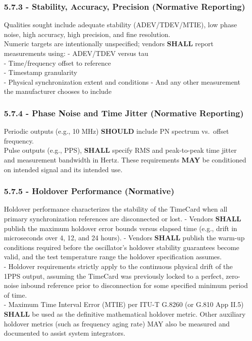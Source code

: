 \documentclass[
]{article}
\begin{document}
\subsubsection{5.7.3 - Stability, Accuracy, Precision (Normative
Reporting)}\label{stability-accuracy-precision-normative-reporting}

Qualities sought include adequate stability (ADEV/TDEV/MTIE), low phase
noise, high accuracy, high precision, and fine resolution.\\
Numeric targets are intentionally unspecified; vendors \textbf{SHALL}
report measurements using: - ADEV/TDEV versus tau\\
- Time/frequency offset to reference\\
- Timestamp granularity\\
- Physical synchronization extent and conditions - And any other
measurement the manufacturer chooses to include

\subsubsection{5.7.4 - Phase Noise and Time Jitter (Normative
Reporting)}\label{phase-noise-and-time-jitter-normative-reporting}

Periodic outputs (e.g., 10 MHz) \textbf{SHOULD} include PN spectrum
vs.~offset frequency.\\
Pulse outputs (e.g., PPS), \textbf{SHALL} specify RMS and peak-to-peak
time jitter and measurement bandwidth in Hertz. These requirements
\textbf{MAY} be conditioned on intended signal and its intended use.

\subsubsection{5.7.5 - Holdover Performance
(Normative)}\label{holdover-performance-normative}

Holdover performance characterizes the stability of the TimeCard when
all primary synchronization references are disconnected or lost. -
Vendors \textbf{SHALL} publish the maximum holdover error bounds versus
elapsed time (e.g., drift in microseconds over 4, 12, and 24 hours). -
Vendors \textbf{SHALL} publish the warm-up conditions required before
the oscillator's holdover stability guarantees become valid, and the
test temperature range the holdover specification assumes.\\
- Holdover requirements strictly apply to the continuous physical drift
of the 1PPS output, assuming the TimeCard was previously locked to a
perfect, zero-noise inbound reference prior to disconnection for some
specified minimum period of time.\\
- Maximum Time Interval Error (MTIE) per ITU-T G.8260 (or G.810 App
II.5) \textbf{SHALL} be used as the definitive mathematical holdover
metric. Other auxiliary holdover metrics (such as frequency aging rate)
MAY also be measured and documented to assist system integrators.
\end{document}
